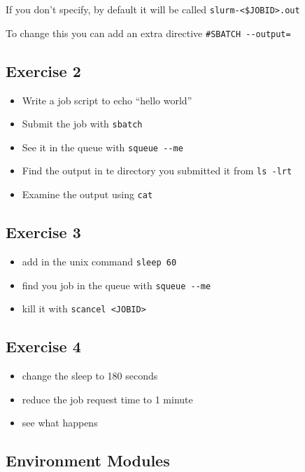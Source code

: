 \documentclass[
  letterpaper,
  DIV=11,
  numbers=noendperiod]{scrartcl}
\providecommand{\tightlist}{%
  \setlength{\itemsep}{0pt}\setlength{\parskip}{0pt}}
\begin{document}
If you don't specify, by default it will be called
\texttt{slurm-\textless{}\$JOBID\textgreater{}.out}

To change this you can add an extra directive
\texttt{\#SBATCH\ -\/-output=}

\subsection{Exercise 2}\label{exercise-2}

\begin{itemize}
\tightlist
\item
  Write a job script to echo ``hello world''
\item
  Submit the job with \texttt{sbatch}
\item
  See it in the queue with \texttt{squeue\ -\/-me}
\item
  Find the output in te directory you submitted it from
  \texttt{ls\ -lrt}
\item
  Examine the output using \texttt{cat}
\end{itemize}

\subsection{Exercise 3}\label{exercise-3}

\begin{itemize}
\tightlist
\item
  add in the unix command \texttt{sleep\ 60}
\item
  find you job in the queue with \texttt{squeue\ -\/-me}
\item
  kill it with \texttt{scancel\ \textless{}JOBID\textgreater{}}
\end{itemize}

\subsection{Exercise 4}\label{exercise-4}

\begin{itemize}
\tightlist
\item
  change the sleep to 180 seconds
\item
  reduce the job request time to 1 minute
\item
  see what happens
\end{itemize}

\subsection{Environment Modules}\label{environment-modules}
\end{document}
